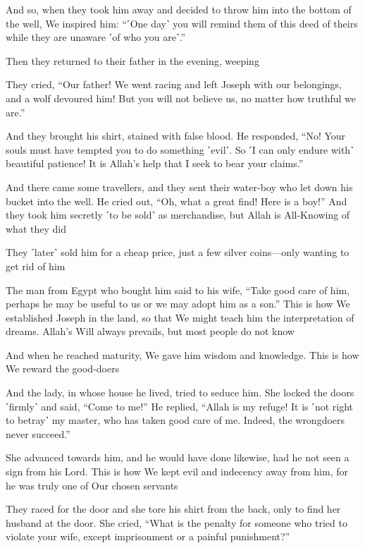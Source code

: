And so, when they took him away and decided to throw him into the bottom of the well, We inspired him: “˹One day˺ you will remind them of this deed of theirs while they are unaware ˹of who you are˺.”

Then they returned to their father in the evening, weeping

They cried, “Our father! We went racing and left Joseph with our belongings, and a wolf devoured him! But you will not believe us, no matter how truthful we are.”

And they brought his shirt, stained with false blood. He responded, “No! Your souls must have tempted you to do something ˹evil˺. So ˹I can only endure with˺ beautiful patience! It is Allah’s help that I seek to bear your claims.”

And there came some travellers, and they sent their water-boy who let down his bucket into the well. He cried out, “Oh, what a great find! Here is a boy!” And they took him secretly ˹to be sold˺ as merchandise, but Allah is All-Knowing of what they did

They ˹later˺ sold him for a cheap price, just a few silver coins—only wanting to get rid of him

The man from Egypt who bought him said to his wife, “Take good care of him, perhaps he may be useful to us or we may adopt him as a son.” This is how We established Joseph in the land, so that We might teach him the interpretation of dreams. Allah’s Will always prevails, but most people do not know

And when he reached maturity, We gave him wisdom and knowledge. This is how We reward the good-doers

And the lady, in whose house he lived, tried to seduce him. She locked the doors ˹firmly˺ and said, “Come to me!” He replied, “Allah is my refuge! It is ˹not right to betray˺ my master, who has taken good care of me. Indeed, the wrongdoers never succeed.”

She advanced towards him, and he would have done likewise, had he not seen a sign from his Lord. This is how We kept evil and indecency away from him, for he was truly one of Our chosen servants

They raced for the door and she tore his shirt from the back, only to find her husband at the door. She cried, “What is the penalty for someone who tried to violate your wife, except imprisonment or a painful punishment?”

